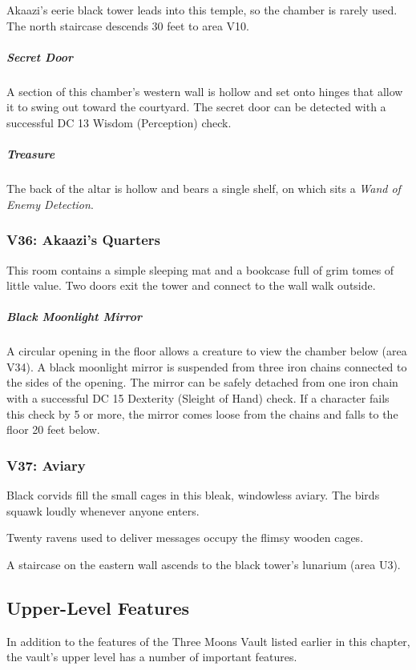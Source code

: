\documentclass[10pt,a4paper,twoside,bg=print,twocolumn,openany,nodeprecatedcode]{dndbook}
\begin{document}
Akaazi's eerie black tower leads into this temple, so the chamber is rarely used. The north staircase descends 30 feet to area V10.

\subparagraph{Secret Door}
A section of this chamber's western wall is hollow and set onto hinges that allow it to swing out toward the courtyard. The secret door can be detected with a successful DC 13 Wisdom (Perception) check.

\subparagraph{Treasure}
The back of the altar is hollow and bears a single shelf, on which sits a \textit{Wand of Enemy Detection}.

\subsubsection{V36: Akaazi's Quarters}
\begin{DndReadAloud}{}
This room contains a simple sleeping mat and a bookcase full of grim tomes of little value. Two doors exit the tower and connect to the wall walk outside.

\end{DndReadAloud}

\subparagraph{Black Moonlight Mirror}
A circular opening in the floor allows a creature to view the chamber below (area V34). A black moonlight mirror is suspended from three iron chains connected to the sides of the opening. The mirror can be safely detached from one iron chain with a successful DC 15 Dexterity (Sleight of Hand) check. If a character fails this check by 5 or more, the mirror comes loose from the chains and falls to the floor 20 feet below.

\subsubsection{V37: Aviary}
\begin{DndReadAloud}{}
Black corvids fill the small cages in this bleak, windowless aviary. The birds squawk loudly whenever anyone enters.

\end{DndReadAloud}

Twenty ravens used to deliver messages occupy the flimsy wooden cages.

A staircase on the eastern wall ascends to the black tower's lunarium (area U3).

\subsection{Upper-Level Features}
In addition to the features of the Three Moons Vault listed earlier in this chapter, the vault's upper level has a number of important features.
\end{document}
